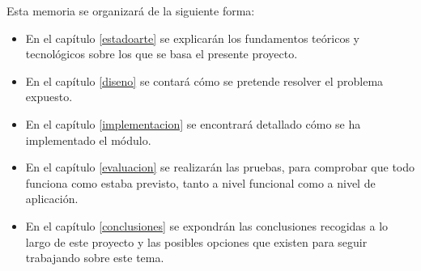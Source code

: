 Esta memoria se organizará de la siguiente forma: 
\begin{itemize}
\item En el capítulo \ref{estadoarte} se explicarán los fundamentos teóricos y tecnológicos sobre los que se basa el presente 
proyecto.
\item En el capítulo \ref{diseno} se contará cómo se pretende resolver el problema expuesto.
\item En el capítulo \ref{implementacion} se encontrará detallado cómo se ha implementado el módulo.
\item En el capítulo \ref{evaluacion} se realizarán las pruebas, para comprobar que todo funciona como estaba previsto, tanto a nivel 
funcional como a nivel de aplicación.
\item En el capítulo \ref{conclusiones} se expondrán las conclusiones recogidas a lo largo de este proyecto y las posibles 
opciones que existen para seguir trabajando sobre este tema.
\end{itemize}
